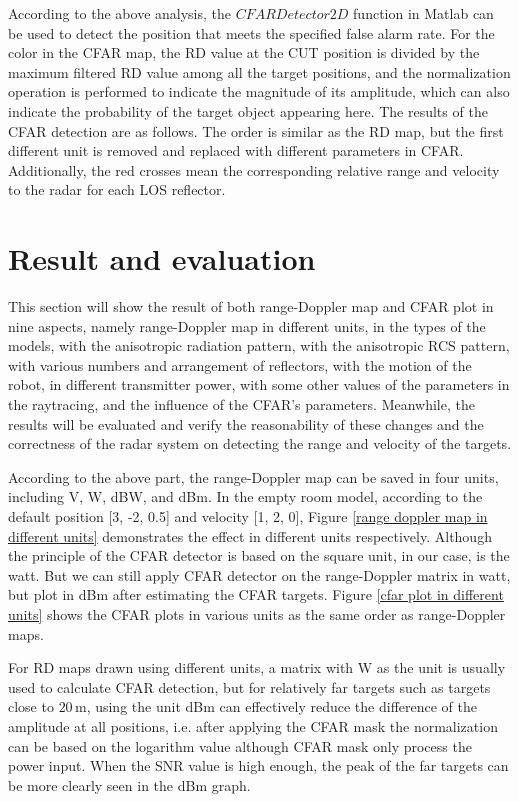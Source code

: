 \documentclass[12pt,DIV14,BCOR12mm,a4paper,footinclude=false,headinclude,parskip=half-,twoside,openright,cleardoublepage=empty,toc=index,bibliography=totoc,listof=totoc]{scrreprt}
\numberwithin{equation}{chapter}
\begin{document}
According to the above analysis, the $CFARDetector2D$ function in Matlab can be used to detect the position that meets the specified false alarm rate. For the color in the CFAR map, the RD value at the CUT position is divided by the maximum filtered RD value among all the target positions, and the normalization operation is performed to indicate the magnitude of its amplitude, which can also indicate the probability of the target object appearing here. The results of the CFAR detection are as follows. The order is similar as the RD map, but the first different unit is removed and replaced with different parameters in CFAR. Additionally, the red crosses mean the corresponding relative range and velocity to the radar for each LOS reflector.


\section{Result and evaluation} \label{Evaluation}

This section will show the result of both range-Doppler map and CFAR plot in nine aspects, namely range-Doppler map in different units, in the types of the models, with the anisotropic radiation pattern, with the anisotropic RCS pattern, with various numbers and arrangement of reflectors, with the motion of the robot, in different transmitter power, with some other values of the parameters in the raytracing, and the influence of the CFAR's parameters. Meanwhile, the results will be evaluated and verify the reasonability of these changes and the correctness of the radar system on detecting the range and velocity of the targets.

According to the above part, the range-Doppler map can be saved in four units, including V, W, dBW, and dBm. In the empty room model, according to the default position [3, -2, 0.5] and velocity [1, 2, 0], Figure \ref{range doppler map in different units} demonstrates the effect in different units respectively. Although the principle of the CFAR detector is based on the square unit, in our case, is the watt. But we can still apply CFAR detector on the range-Doppler matrix in watt, but plot in dBm after estimating the CFAR targets. Figure \ref{cfar plot in different units} shows the CFAR plots in various units as the same order as range-Doppler maps.

For RD maps drawn using different units, a matrix with W as the unit is usually used to calculate CFAR detection, but for relatively far targets such as targets close to $20\,\mathrm{m}$, using the unit dBm can effectively reduce the difference of the amplitude at all positions, i.e. after applying the CFAR mask the normalization can be based on the logarithm value although CFAR mask only process the power input. When the SNR value is high enough, the peak of the far targets can be more clearly seen in the dBm graph.
\end{document}
